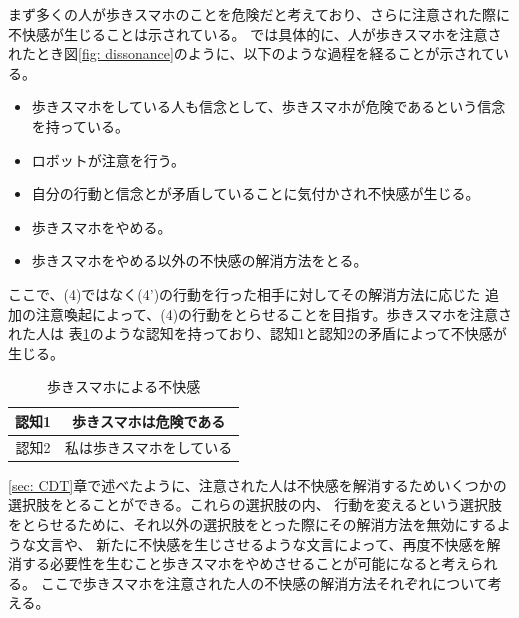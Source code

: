 \documentclass{kuisthesis}
\begin{document}
まず多くの人が歩きスマホのことを危険だと考えており、さらに注意された際に不快感が生じることは示されている。
\cite{Schneider2022}では具体的に、人が歩きスマホを注意されたとき図\ref{fig: dissonance}のように、以下のような過程を経ることが示されている。
\begin{itemize}
  \item[(1)] 歩きスマホをしている人も信念として、歩きスマホが危険であるという信念を持っている。
  \item[(2)] ロボットが注意を行う。
  \item[(3)] 自分の行動と信念とが矛盾していることに気付かされ不快感が生じる。
  \item[(4)] 歩きスマホをやめる。
  \item[(4')]歩きスマホをやめる以外の不快感の解消方法をとる。
  \label{item: dissonance}
\end{itemize}
ここで、(4)ではなく(4')の行動を行った相手に対してその解消方法に応じた
追加の注意喚起によって、(4)の行動をとらせることを目指す。歩きスマホを注意された人は
表\ref{fig: UsingPhone}のような認知を持っており、認知1と認知2の矛盾によって不快感が生じる。
\begin{table}[h]
  \centering
  \caption{歩きスマホによる不快感}
  \label{fig: UsingPhone}
  \begin{tabular}{c|c}

      認知1 & 歩きスマホは危険である  \\ \hline
      認知2 & 私は歩きスマホをしている \\ 
  \end{tabular}
\end{table}
\ref{sec: CDT}章で述べたように、注意された人は不快感を解消するためいくつかの選択肢をとることができる。これらの選択肢の内、
行動を変えるという選択肢をとらせるために、それ以外の選択肢をとった際にその解消方法を無効にするような文言や、
新たに不快感を生じさせるような文言によって、再度不快感を解消する必要性を生むこと歩きスマホをやめさせることが可能になると考えられる。
ここで歩きスマホを注意された人の不快感の解消方法それぞれについて考える。
\end{document}
